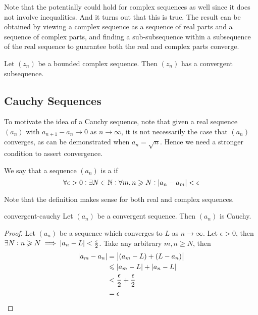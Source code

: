 \documentclass{styles/tufte}
\begin{document}
    Note that the  potentially could hold for complex sequences as well since it does not involve inequalities. And it turns out that this is true. The result can be obtained by viewing a complex sequence as a sequence of real parts and a sequence of complex parts, and finding a sub-subsequence within a subsequence of the real sequence to guarantee both the real and complex parts converge.
    
    \begin{corollary}
      Let $(z_n)$ be a bounded complex sequence. Then $(z_n)$ has a convergent subsequence.
    \end{corollary}
  
  
  \subsection{Cauchy Sequences}
    
    To motivate the idea of a Cauchy sequence, note that given a real sequence $(a_n)$ with $a_{n+1} - a_n \to 0$ as $n \to \infty$, it is not necessarily the case that $(a_n)$ converges, as can be demonstrated when $a_n = \sqrt{n}$. Hence we need a stronger condition to assert convergence.
    
    \begin{definition}
      We say that a sequence $(a_n)$ is a  if
      \[ \forall \epsilon > 0 : \exists N \in \NN : \forall m, n \geqslant N : \abs{a_n - a_m} < \epsilon \]
    \end{definition}
    
    Note that the definition makes sense for both real and complex sequences.
    
    \begin{proposition}{}{convergent-cauchy}
      Let $(a_n)$ be a convergent sequence. Then $(a_n)$ is Cauchy.
    \end{proposition}
    \begin{proof}
      Let $(a_n)$ be a sequence which converges to $L$ as $n \to \infty$. Let $\epsilon > 0$, then $\exists N : n \geqslant N \implies \abs{a_n - L} < \frac{\epsilon}{2}$. Take any arbitrary $m, n \geqslant N$, then
      \begin{align*}
        \abs{a_m - a_n} &= \abs{(a_m - L) + (L - a_n)} \\
        &\leqslant \abs{a_m - L} + \abs{a_n - L} \\
        &< \frac{\epsilon}{2} + \frac{\epsilon}{2} \\
        &= \epsilon \qedhere
      \end{align*}
    \end{proof}
    
\end{document}
